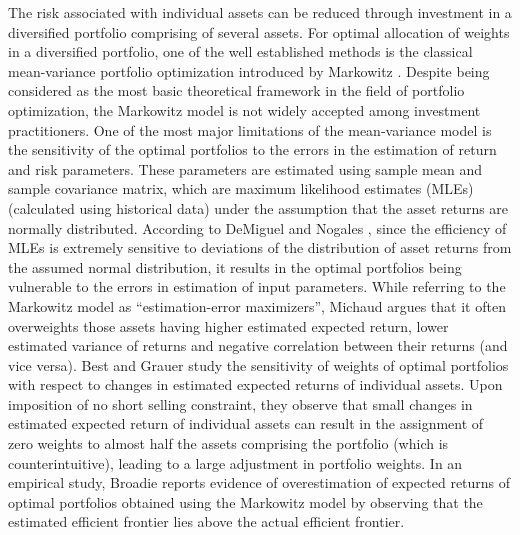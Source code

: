 \documentclass[12pt]{article}
\numberwithin{equation}{section}
\begin{document}
The risk associated with individual assets can be reduced through investment in a diversified portfolio comprising of several assets. For optimal allocation of weights in a diversified portfolio, one of the well established methods is the classical mean-variance portfolio optimization introduced by Markowitz \cite{Markowitz52,Markowitz59}. Despite being considered as the most basic theoretical framework in the field of portfolio optimization, the Markowitz model is not widely accepted among investment practitioners. One of the most major limitations of the mean-variance model is the sensitivity of the optimal portfolios to the errors in the estimation of return and risk parameters. These parameters are estimated using sample mean and sample covariance matrix, which are maximum likelihood estimates (MLEs) (calculated using historical data) under the assumption that the asset returns are normally distributed. According to DeMiguel and Nogales \cite{DeMiguel09}, since the efficiency of MLEs is extremely sensitive to deviations of the distribution of asset returns from the assumed normal distribution, it results in the optimal portfolios being vulnerable to the errors in estimation of input parameters. While referring to the Markowitz model as ``estimation-error maximizers'', Michaud \cite{Michaud89} argues that it often overweights those assets having higher estimated expected return, lower estimated variance of returns and negative correlation between their returns (and vice versa). Best and Grauer \cite{Best91} study the sensitivity of weights of optimal portfolios with respect to changes in estimated expected returns of individual assets. Upon imposition of no short selling constraint, they observe that small changes in estimated expected return of individual assets can result in the assignment of zero weights to almost half the assets comprising the portfolio (which is counterintuitive), leading to a large adjustment in portfolio weights. In an empirical study, Broadie \cite{Broadie93} reports evidence of overestimation of expected returns of optimal portfolios obtained using the Markowitz model by observing that the estimated efficient frontier lies above the actual efficient frontier.
\end{document}

